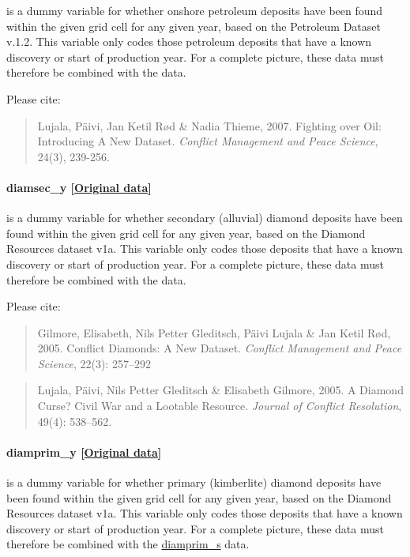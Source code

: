 \documentclass[]{book}
\begin{document}
is a dummy variable for whether onshore petroleum deposits have been
found within the given grid cell for any given year, based on the
Petroleum Dataset v.1.2. This variable only codes those petroleum
deposits that have a known discovery or start of production year. For a
complete picture, these data must therefore be combined with the
 data.

Please cite:

\begin{quote}
Lujala, Päivi, Jan Ketil Rød \& Nadia Thieme, 2007. Fighting over Oil:
Introducing A New Dataset. \emph{Conflict Management and Peace Science},
24(3), 239-256.
\end{quote}

\paragraph{diamsec\_y
{[}\href{https://www.prio.org/Data/Geographical-and-Resource-Datasets/Diamond-Resources/}{Original
data}{]}}\label{diamsec-y}

is a dummy variable for whether secondary (alluvial) diamond deposits
have been found within the given grid cell for any given year, based on
the Diamond Resources dataset v1a. This variable only codes those
deposits that have a known discovery or start of production year. For a
complete picture, these data must therefore be combined with the
 data.

Please cite:

\begin{quote}
Gilmore, Elisabeth, Nils Petter Gleditsch, Päivi Lujala \& Jan Ketil
Rød, 2005. Conflict Diamonds: A New Dataset. \emph{Conflict Management
and Peace Science}, 22(3): 257--292
\end{quote}

\begin{quote}
Lujala, Päivi, Nils Petter Gleditsch \& Elisabeth Gilmore, 2005. A
Diamond Curse? Civil War and a Lootable Resource. \emph{Journal of
Conflict Resolution}, 49(4): 538--562.
\end{quote}

\paragraph{diamprim\_y
{[}\href{https://www.prio.org/Data/Geographical-and-Resource-Datasets/Diamond-Resources/}{Original
data}{]}}\label{diamprim-y}

is a dummy variable for whether primary (kimberlite) diamond deposits
have been found within the given grid cell for any given year, based on
the Diamond Resources dataset v1a. This variable only codes those
deposits that have a known discovery or start of production year. For a
complete picture, these data must therefore be combined with the
\href{}{diamprim\_s} data.
\end{document}
